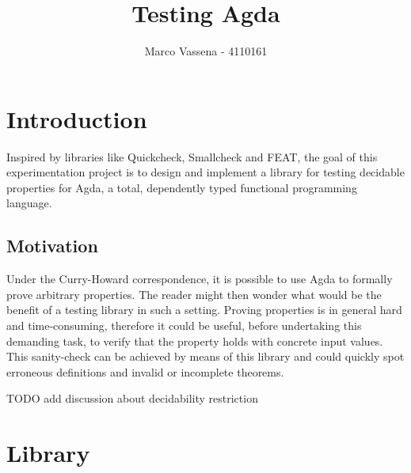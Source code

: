 \documentclass[10pt,a4paper]{article}
\author{Marco Vassena - 4110161}
\title{Testing Agda}
\begin{document}
\maketitle

\section{Introduction}
Inspired by libraries like Quickcheck, Smallcheck and FEAT, the goal of this experimentation project is to design and implement a library for testing decidable properties for Agda, a total, dependently typed functional programming language.

\subsection{Motivation}
Under the Curry-Howard correspondence, it is possible to use Agda to formally prove arbitrary properties. The reader might then wonder what would be the benefit of a testing library in such a setting. Proving properties is in general hard and time-consuming, therefore it could be useful, before undertaking this demanding task, to verify that the property holds with concrete input values. This sanity-check can be achieved by means of this library and could quickly spot erroneous definitions and invalid or incomplete theorems.

TODO add discussion about decidability restriction

\section{Library}
\end{document}
